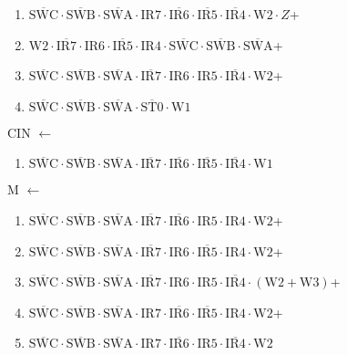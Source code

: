 \documentclass[UTF8]{ctexart}
\begin{document}
\begin{enumerate}[\indent\indent]
	\item $\overline{\text{SWC}} \cdot\overline{\text{SWB}}\cdot \overline{\text{SWA}} \cdot \text{IR7} \cdot \overline{\text{IR6}} \cdot \overline{\text{IR5}} \cdot \overline{\text{IR4}} \cdot \text{W2} \cdot Z$+
	\item $\text{W2} \cdot \overline{\text{IR7}} \cdot \text{IR6} \cdot \overline{\text{IR5}} \cdot \text{IR4} \cdot \overline{\text{SWC}} \cdot\overline{\text{SWB}}\cdot \overline{\text{SWA}}$+
	\item $\overline{\text{SWC}} \cdot\overline{\text{SWB}}\cdot \overline{\text{SWA}} \cdot \overline{\text{IR7}} \cdot \text{IR6} \cdot \text{IR5} \cdot \overline{\text{IR4}} \cdot \text{W2}$+
	\item $\overline{\text{SWC}}\cdot\overline{\text{SWB}}\cdot\overline{\text{SWA}}\cdot\overline{\text{ST0}}\cdot\text{W1}$
\end{enumerate}

CIN $\leftarrow$
\begin{enumerate}[\indent\indent]
	\item $\overline{\text{SWC}} \cdot\overline{\text{SWB}}\cdot \overline{\text{SWA}} \cdot \overline{\text{IR7}} \cdot \overline{\text{IR6}} \cdot \overline{\text{IR5}} \cdot \overline{\text{IR4}} \cdot \text{W1}$
\end{enumerate}

M $\leftarrow$
\begin{enumerate}[\indent\indent]
	\item $\overline{\text{SWC}} \cdot\overline{\text{SWB}}\cdot \overline{\text{SWA}} \cdot \overline{\text{IR7}} \cdot \overline{\text{IR6}} \cdot \text{IR5} \cdot \text{IR4} \cdot \text{W2}$+
	\item $\overline{\text{SWC}} \cdot\overline{\text{SWB}}\cdot \overline{\text{SWA}} \cdot \overline{\text{IR7}} \cdot \text{IR6} \cdot \overline{\text{IR5}} \cdot \text{IR4} \cdot \text{W2}$+
	\item $\overline{\text{SWC}} \cdot\overline{\text{SWB}}\cdot \overline{\text{SWA}} \cdot \overline{\text{IR7}} \cdot \text{IR6} \cdot \text{IR5} \cdot \overline{\text{IR4}} \cdot (\text{W2} + \text{W3})$+
	\item $\overline{\text{SWC}} \cdot\overline{\text{SWB}}\cdot \overline{\text{SWA}} \cdot \text{IR7} \cdot \overline{\text{IR6}} \cdot \overline{\text{IR5}} \cdot \text{IR4} \cdot \text{W2}$+
	\item $\overline{\text{SWC}} \cdot\overline{\text{SWB}}\cdot \overline{\text{SWA}} \cdot \text{IR7} \cdot \overline{\text{IR6}} \cdot \text{IR5} \cdot \overline{\text{IR4}} \cdot \text{W2}$
\end{enumerate}
\end{document}
